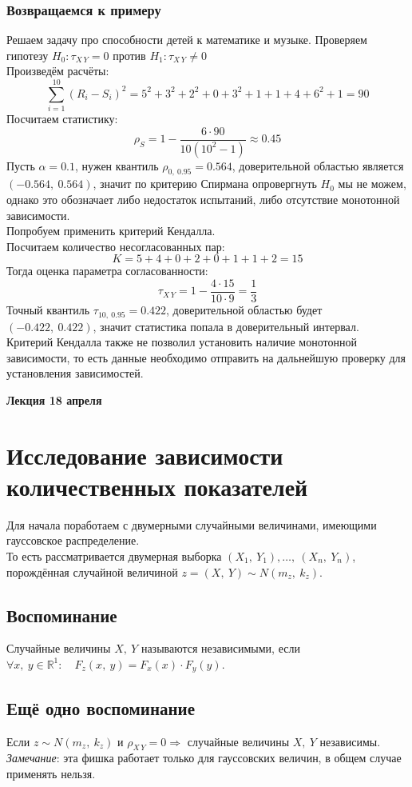 \documentclass[12pt, a4paper]{article}
\newcommand{\real}{\mathbb{R}}
\begin{document}
\subsubsection*{Возвращаемся к примеру}
Решаем задачу про способности детей к математике и музыке. Проверяем гипотезу $H_0: \tau_{X\, Y} = 0$ против $H_1: \tau_{X\, Y} \neq 0$\\
Произведём расчёты:
\[ \sum_{i = 1}^{10} {\left( R_i - S_i \right)}^2 = 5^2 + 3^2 + 2^2 + 0 + 3^2 + 1 + 1 + 4 + 6^2 + 1 = 90 \]
Посчитаем статистику:
\[\rho_S = 1 - \frac{6\cdot 90}{10 (10^2 - 1)} \approx 0.45\]
Пусть $\alpha = 0.1$, нужен квантиль $\rho_{0,\ 0.95} = 0.564$, доверительной областью является $(-0.564,\ 0.564)$, значит по критерию Спирмана опровергнуть $H_0$ мы не можем, однако это обозначает либо недостаток испытаний, либо отсутствие монотонной зависимости.\\
Попробуем применить критерий Кендалла.\\
Посчитаем количество несогласованных пар:
\[K = 5 + 4 + 0 + 2 + 0 + 1 + 1 + 2 = 15\]
Тогда оценка параметра согласованности:
\[\tau_{X\, Y} = 1 - \frac{4\cdot 15}{10 \cdot 9} = \frac{1}{3}\]
Точный квантиль $\tau_{10,\ 0.95} = 0.422$, доверительной областью будет $(-0.422,\ 0.422)$, значит статистика попала в доверительный интервал. Критерий Кендалла также не позволил установить наличие монотонной зависимости, то есть данные необходимо отправить на дальнейшую проверку для установления зависимостей. 

\newpage
\begin{center}
    \bf Лекция 18 апреля
\end{center}
\section*{Исследование зависимости количественных показателей}
Для начала поработаем с двумерными случайными величинами, имеющими гауссовское распределение.\\
То есть рассматривается двумерная выборка $(X_1,\ Y_1),\dots,\ (X_n,\ Y_n)$, порождённая случайной величиной $z = (X,\ Y) \sim N(m_z,\ k_z)$.
\subsection*{Воспоминание}
Случайные величины $X,\ Y$ называются независимыми, если $\forall x,\ y \in \real^1:\quad F_z (x,\ y) = F_x(x)\cdot F_y(y)$.
\subsection*{Ещё одно воспоминание}
Если $z \sim N(m_z,\ k_z)$ и $\rho_{X\, Y} = 0 \Rightarrow$ случайные величины $X,\ Y$ независимы.\\
\textit{Замечание}: эта фишка работает только для гауссовских величин, в общем случае применять нельзя.
\end{document}
